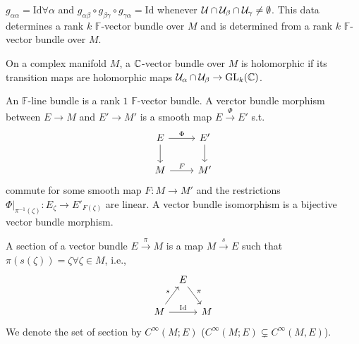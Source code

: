 $g_{\alpha \alpha}=\mathrm{Id}\forall \alpha$ and $g_{\alpha \beta }\circ g_{\beta \gamma}\circ g_{\gamma \alpha}=\mathrm{Id}$ whenever $\mathcal{U}\cap \mathcal{U}_\beta \cap \mathcal{U}_\gamma\neq \emptyset$. This data determines a rank $k$ $\mathbb{F}$-vector bundle over $M$ and is determined from a rank $k$ $\mathbb{F}$-vector bundle over $M$. 
\begin{definition}
  On a complex manifold $M$,
a $\mathbb{C}$-vector bundle over $M$ is holomorphic if its transition maps are holomorphic maps $\mathcal{U}_\alpha \cap  \mathcal{U}_\beta \to \operatorname{GL}_k(\mathbb{C})$.
\end{definition}

An $\mathbb{F}$-line bundle is a rank $1$ $\mathbb{F}$-vector bundle. A verctor bundle morphism between $E\to M$ and $E'\to M'$ is a smooth map $E\xrightarrow{\Phi}E'$ s.t. 
\[
\begin{tikzcd}
  E\arrow[r, "\Phi"]\arrow[d] &  E'\arrow[d] \\
  M\arrow[r,"F"]  & M'
\end{tikzcd}
\] 
commute for some smooth map $F:M\to M'$ and the restrictions $\Phi|_{\pi^{-1}(\zeta)}:E_{\zeta }\to E'_{F(\zeta)}$ are linear. A vector bundle isomorphism is a bijective vector bundle morphism. 

A section of a vector bundle $E\xrightarrow{\pi}M$ is a map $M\xrightarrow{s}E$ such that $\pi\left( s(\zeta) \right) =\zeta \forall \zeta \in M$, i.e.,
\[
  \begin{tikzcd}[column sep=tiny]
  & E\arrow[rd,"\pi"]  & \\
  M \arrow[ur,"s"]\arrow[rr,"\mathrm{Id}"]& & M  
\end{tikzcd}
\]
We denote the set of section by $C^{\infty}(M;E)$ ($C^{\infty}(M;E)\subsetneq C^{\infty}(M,E)$).

